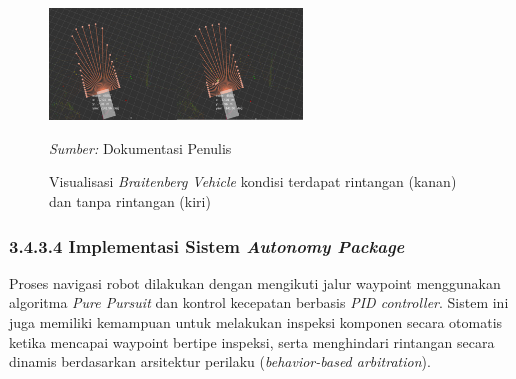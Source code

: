 \begin{figure}[H]
  \centering
  \includegraphics[width=0.6\textwidth]{gambar/bab3/obstacle-bb.png}
  \caption{Visualisasi \emph{Braitenberg Vehicle} kondisi terdapat rintangan (kanan) dan tanpa rintangan (kiri)}
  \label{fig:obstacle-detector}
  \footnotesize{\emph{Sumber:} Dokumentasi Penulis}
\end{figure}


\subsubsection{3.4.3.4 Implementasi Sistem \emph{Autonomy Package}}

Proses navigasi robot dilakukan dengan mengikuti jalur waypoint menggunakan algoritma \emph{Pure Pursuit} dan kontrol kecepatan berbasis \emph{PID controller}. Sistem ini juga memiliki kemampuan untuk melakukan inspeksi komponen secara otomatis ketika mencapai waypoint bertipe inspeksi, serta menghindari rintangan secara dinamis berdasarkan arsitektur perilaku (\emph{behavior-based arbitration}).

